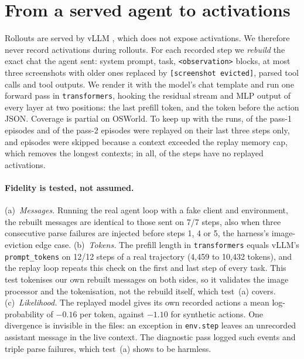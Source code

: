 \section{From a served agent to activations}
\label{sec:replay}

Rollouts are served by vLLM \citep{kwon2023vllm}, which does not expose activations. We therefore never record activations during rollouts. For each recorded step we \emph{rebuild} the exact chat the agent sent: system prompt, task, \texttt{<observation>} blocks, at most three screenshots with older ones replaced by \texttt{[screenshot evicted]}, parsed tool calls and tool outputs. We render it with the model's chat template and run one forward pass in \texttt{transformers}, hooking the residual stream and MLP output of every layer at two positions: the last prefill token, and the token before the action JSON. Coverage is partial on OSWorld. To keep up with the runs, \replayTailDiag{} of the \replayScoredDiag{} pass-1 episodes and \replayTailDiagTwo{} of the \replayScoredDiagTwo{} pass-2 episodes were replayed on their last three steps only, and \replayOom{} episodes were skipped because a context exceeded the replay memory cap, which removes the longest contexts; in all, \replayFsLost{} of the \replayFsAll{} \fsp{} steps have no replayed activations. %

\paragraph{Fidelity is tested, not assumed.}
(a)~\emph{Messages.} Running the real agent loop with a fake client and environment, the rebuilt messages are identical to those sent on 7/7 steps, also when three consecutive parse failures are injected before steps 1, 4 or 5, the harness's image-eviction edge case. %
(b)~\emph{Tokens.} The prefill length in \texttt{transformers} equals vLLM's \texttt{prompt\_tokens} on 12/12 steps of a real trajectory (4{,}459 to 10{,}432 tokens), and the replay loop repeats this check on the first and last step of every task. This test tokenises our own rebuilt messages on both sides, so it validates the image processor and the tokenisation, not the rebuild itself, which test~(a) covers. %
(c)~\emph{Likelihood.} The replayed model gives its own recorded actions a mean log-probability of $-0.16$ per token, against $-1.10$ for synthetic actions. %
One divergence is invisible in the files: an exception in \texttt{env.step} leaves an unrecorded assistant message in the live context. The diagnostic pass logged \bEnvFail{} such events and \bParseFail{} triple parse failures, which test~(a) shows to be harmless.
